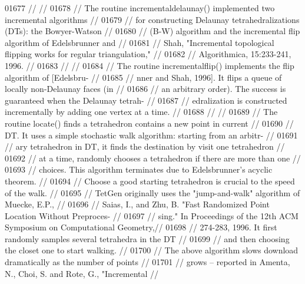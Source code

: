 \begin{DoxyCode}
01677 \textcolor{comment}{//                                                                           //}
01678 \textcolor{comment}{// The routine incrementaldelaunay() implemented two incremental algorithms  //}
01679 \textcolor{comment}{// for constructing Delaunay tetrahedralizations (DTs):  the Bowyer-Watson   //}
01680 \textcolor{comment}{// (B-W) algorithm and the incremental flip algorithm of Edelsbrunner and    //}
01681 \textcolor{comment}{// Shah, "Incremental topological flipping works for regular triangulation," //}
01682 \textcolor{comment}{// Algorithmica, 15:233-241, 1996.                                           //}
01683 \textcolor{comment}{//                                                                           //}
01684 \textcolor{comment}{// The routine incrementalflip() implements the flip algorithm of [Edelsbru- //}
01685 \textcolor{comment}{// nner and Shah, 1996].  It flips a queue of locally non-Delaunay faces (in //}
01686 \textcolor{comment}{// an arbitrary order).  The success is guaranteed when the Delaunay tetrah- //}
01687 \textcolor{comment}{// edralization is constructed incrementally by adding one vertex at a time. //}
01688 \textcolor{comment}{//                                                                           //}
01689 \textcolor{comment}{// The routine locate() finds a tetrahedron contains a new point in current  //}
01690 \textcolor{comment}{// DT.  It uses a simple stochastic walk algorithm: starting from an arbitr- //}
01691 \textcolor{comment}{// ary tetrahedron in DT, it finds the destination by visit one tetrahedron  //}
01692 \textcolor{comment}{// at a time, randomly chooses a tetrahedron if there are more than one      //}
01693 \textcolor{comment}{// choices. This algorithm terminates due to Edelsbrunner's acyclic theorem. //}
01694 \textcolor{comment}{//   Choose a good starting tetrahedron is crucial to the speed of the walk. //}
01695 \textcolor{comment}{// TetGen originally uses the "jump-and-walk" algorithm of Muecke, E.P.,     //}
01696 \textcolor{comment}{// Saias, I., and Zhu, B. "Fast Randomized Point Location Without Preproces- //}
01697 \textcolor{comment}{// sing." In Proceedings of the 12th ACM Symposium on Computational Geometry,//}
01698 \textcolor{comment}{// 274-283, 1996.  It first randomly samples several tetrahedra in the DT    //}
01699 \textcolor{comment}{// and then choosing the closet one to start walking.                        //}
01700 \textcolor{comment}{//   The above algorithm slows download dramatically as the number of points //}
01701 \textcolor{comment}{// grows -- reported in Amenta, N., Choi, S. and Rote, G., "Incremental      //}

\end{DoxyCode}
